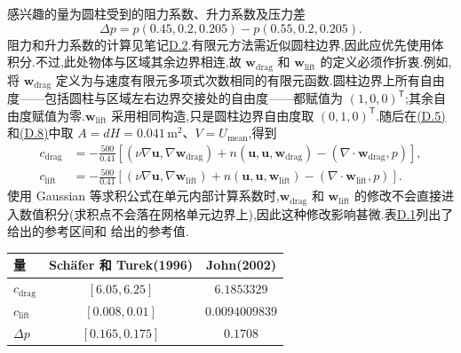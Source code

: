 \begin{example}[三维中 $\mathrm{Re}=20$ 的定常圆柱绕流]
感兴趣的量为圆柱受到的阻力系数、升力系数及压力差
\begin{equation}\label{eq:appendix-d-23}
\Delta p=p(0.45,0.2,0.205)-p(0.55,0.2,0.205).
\end{equation}
阻力和升力系数的计算见笔记\hyperref[note:appendix-d-2]{D.2}.有限元方法需近似圆柱边界,因此应优先使用体积分.不过,此处物体与区域其余边界相连,故 $\bm w_{\mathrm{drag}}$ 和 $\bm w_{\mathrm{lift}}$ 的定义必须作折衷.例如,\textcite{John2002} 将 $\bm w_{\mathrm{drag}}$ 定义为与速度有限元多项式次数相同的有限元函数.圆柱边界上所有自由度——包括圆柱与区域左右边界交接处的自由度——都赋值为 $(1,0,0)^\mathsf T$;其余自由度赋值为零.$\bm w_{\mathrm{lift}}$ 采用相同构造,只是圆柱边界自由度取 $(0,1,0)^\mathsf T$.随后在\hyperref[eq:appendix-d-5]{(D.5)}和\hyperref[eq:appendix-d-8]{(D.8)}中取 $A=dH=0.041\,\mathrm{m^2}$、$V=U_{\mathrm{mean}}$,得到
\[
\begin{aligned}
c_{\mathrm{drag}}
&=-\frac{500}{0.41}\left[
(\nu\nabla\bm u,\nabla\bm w_{\mathrm{drag}})
+n(\bm u,\bm u,\bm w_{\mathrm{drag}})
-(\nabla\cdot\bm w_{\mathrm{drag}},p)\right],\\
c_{\mathrm{lift}}
&=-\frac{500}{0.41}\left[
(\nu\nabla\bm u,\nabla\bm w_{\mathrm{lift}})
+n(\bm u,\bm u,\bm w_{\mathrm{lift}})
-(\nabla\cdot\bm w_{\mathrm{lift}},p)\right].
\end{aligned}
\]
使用 Gaussian 等求积公式在单元内部计算系数时,$\bm w_{\mathrm{drag}}$ 和 $\bm w_{\mathrm{lift}}$ 的修改不会直接进入数值积分(求积点不会落在网格单元边界上),因此这种修改影响甚微.表\hyperref[tab:appendix-d-1]{D.1}列出了\textcite{SchaeferTurek1996} 给出的参考区间和\textcite{John2002} 给出的参考值.
\begin{eleganttable}
\label{tab:appendix-d-1}
\begin{tabular}{lcc}
\toprule
量 & Schäfer 和 Turek(1996) & John(2002)\\
\midrule
$c_{\mathrm{drag}}$ & $[6.05,6.25]$ & $6.1853329$\\
$c_{\mathrm{lift}}$ & $[0.008,0.01]$ & $0.0094009839$\\
$\Delta p$ & $[0.165,0.175]$ & $0.1708$\\
\bottomrule
\end{tabular}
\end{eleganttable}
\end{example}
